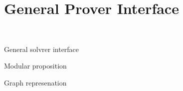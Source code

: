 \section{General Prover Interface}~\label{sec:interface}

General solvrer interface

Modular proposition

Graph represenation 



